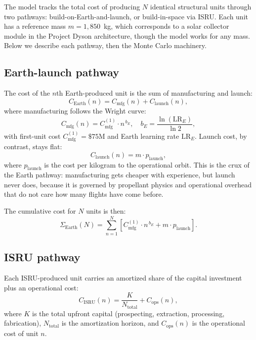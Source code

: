 \documentclass[preprint,12pt]{elsarticle}
\begin{document}
The model tracks the total cost of producing $N$ identical structural units through two pathways: build-on-Earth-and-launch, or build-in-space via ISRU. Each unit has a reference mass $m = 1{,}850$~kg, which corresponds to a solar collector module in the Project Dyson architecture, though the model works for any mass. Below we describe each pathway, then the Monte Carlo machinery.

\subsection{Earth-launch pathway}

The cost of the $n$th Earth-produced unit is the sum of manufacturing and launch:
\begin{equation}
  C_{\mathrm{Earth}}(n) = C_{\mathrm{mfg}}(n) + C_{\mathrm{launch}}(n),
  \label{eq:earth_unit}
\end{equation}
where manufacturing follows the Wright curve:
\begin{equation}
  C_{\mathrm{mfg}}(n) = C_{\mathrm{mfg}}^{(1)} \cdot n^{\,b_E}, \quad b_E = \frac{\ln(\mathrm{LR}_E)}{\ln 2},
  \label{eq:earth_mfg}
\end{equation}
with first-unit cost $C_{\mathrm{mfg}}^{(1)} = \$75$M and Earth learning rate $\mathrm{LR}_E$. Launch cost, by contrast, stays flat:
\begin{equation}
  C_{\mathrm{launch}}(n) = m \cdot p_{\mathrm{launch}},
  \label{eq:earth_launch}
\end{equation}
where $p_{\mathrm{launch}}$ is the cost per kilogram to the operational orbit. This is the crux of the Earth pathway: manufacturing gets cheaper with experience, but launch never does, because it is governed by propellant physics and operational overhead that do not care how many flights have come before.

The cumulative cost for $N$ units is then:
\begin{equation}
  \Sigma_{\mathrm{Earth}}(N) = \sum_{n=1}^{N} \left[ C_{\mathrm{mfg}}^{(1)} \cdot n^{\,b_E} + m \cdot p_{\mathrm{launch}} \right].
  \label{eq:earth_cum}
\end{equation}

\subsection{ISRU pathway}

Each ISRU-produced unit carries an amortized share of the capital investment plus an operational cost:
\begin{equation}
  C_{\mathrm{ISRU}}(n) = \frac{K}{N_{\mathrm{total}}} + C_{\mathrm{ops}}(n),
  \label{eq:isru_unit}
\end{equation}
where $K$ is the total upfront capital (prospecting, extraction, processing, fabrication), $N_{\mathrm{total}}$ is the amortization horizon, and $C_{\mathrm{ops}}(n)$ is the operational cost of unit $n$.
\end{document}
